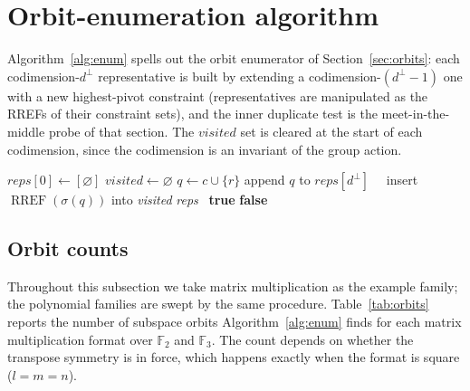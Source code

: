 \documentclass[11pt]{article}
\theoremstyle{definition}
\newcommand{\F}{\mathbb{F}}
\newcommand{\Kappa}{\mathrm{K}}
\newcommand{\RREF}{\operatorname{RREF}}
\begin{document}
\section{Orbit-enumeration algorithm}\label{app:enum}

Algorithm~\ref{alg:enum} spells out the orbit enumerator of
Section~\ref{sec:orbits}: each codimension-$d^{\perp}$ representative is built by extending
a codimension-$(d^{\perp}-1)$ one with a new highest-pivot constraint (representatives are
manipulated as the RREFs of their constraint sets), and the inner
duplicate test is the meet-in-the-middle probe of that section. The
$\textit{visited}$ set is cleared at the start of each codimension, since the
codimension is an invariant of the group action.

\begin{algorithm}[!ht]
  \caption{Enumerate subspace orbits}
  \label{alg:enum}
  \begin{algorithmic}[1]
    \State $\textit{reps}[0]\gets[\varnothing]$
    \State $\textit{visited}\gets\varnothing$
    \State $q \gets c \cup \{r\}$
    \State append $q$ to $\textit{reps}[d^{\perp}]$
    \For{$\sigma\in\Sigma$}\ \ insert $\RREF(\sigma(q))$ into \textit{visited}\EndFor
    \EndIf
    \EndFor
    \EndFor
    \EndFor
    \State \Return \textit{reps}
    \Statex
    \For{$\kappa\in\Kappa$}
    \If{$\RREF(\kappa(q))\in\textit{visited}$}\ \Return \textbf{true}\EndIf
    \EndFor
    \State \Return \textbf{false}
    \EndFunction
  \end{algorithmic}
\end{algorithm}

\subsection*{Orbit counts}\label{app:counts}

Throughout this subsection we take matrix multiplication as the example family;
the polynomial families are swept by the same procedure.
Table~\ref{tab:orbits} reports the number of subspace orbits Algorithm~\ref{alg:enum} finds
for each matrix multiplication format over $\F_2$ and $\F_3$. The count depends on whether the transpose
symmetry is in force, which happens exactly when the format is square ($l=m=n$).
\end{document}
